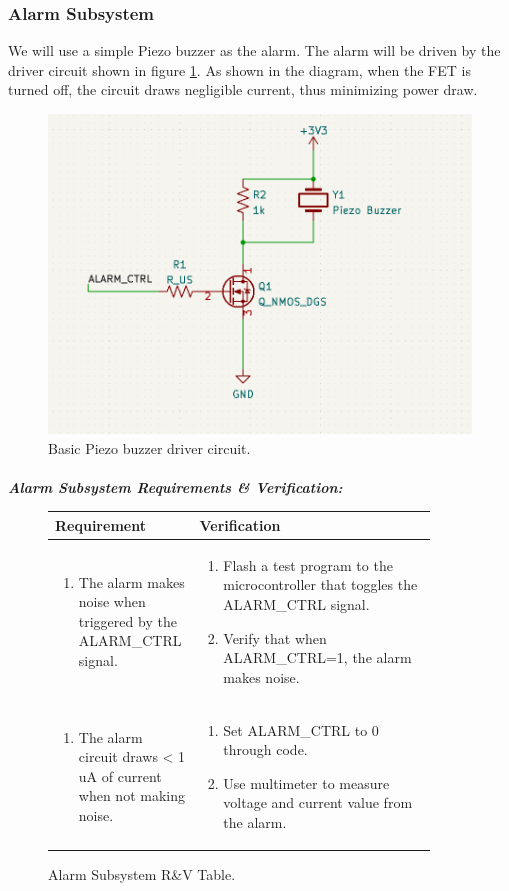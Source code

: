 \documentclass{article}
\begin{document}
\subsubsection{Alarm Subsystem} 

We will use a simple Piezo buzzer as the alarm. The alarm will be driven by the driver circuit shown in figure \ref{buzzer}. As shown in the diagram, when the FET is turned off, the circuit draws negligible current, thus minimizing power draw. 



\begin{center}
	\begin{figure}[H]
		\centering
		\includegraphics[width=0.25 \textwidth]{buzzer_ckt.png}
		\caption{Basic Piezo buzzer driver circuit.} \label{buzzer}
	\end{figure}
\end{center}


\paragraph{} 

\textit{\textbf{Alarm Subsystem Requirements \& Verification:}}


\begin{figure}[H]
	\begin{center}
		\begin{tabular}{|p{0.3 \linewidth}|p{0.6 \linewidth}|}
			\hline
			Requirement & Verification  \\
			\hline
			\begin{enumerate}
				\item The alarm makes noise when triggered by the ALARM\_CTRL signal. 
			\end{enumerate}  & \begin{enumerate}
				\item Flash a test program to the microcontroller that toggles the ALARM\_CTRL signal.
				\item Verify that when ALARM\_CTRL=1, the alarm makes noise. 
			\end{enumerate} \\
			\hline
			\begin{enumerate}
				\item The alarm circuit draws < 1 uA of current when not making noise.
			\end{enumerate}  & \begin{enumerate}
				\item Set ALARM\_CTRL to 0 through code.
				\item Use multimeter to measure voltage and current value from the alarm.
			\end{enumerate} \\
			\hline
		\end{tabular}
	\end{center}
	\caption{Alarm Subsystem R\&V Table.}
\end{figure}
\end{document}
